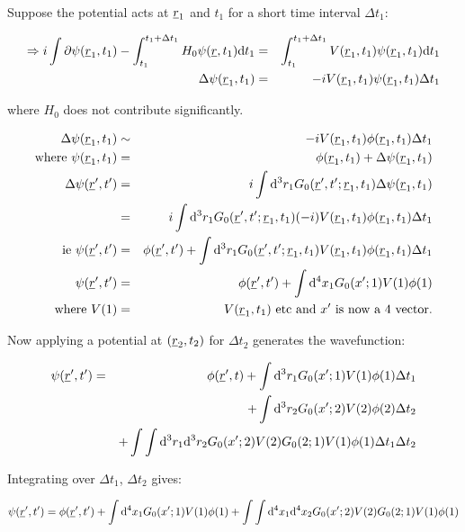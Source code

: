 Suppose the potential acts at $\underline{r}_1$ and $t_1$ for a short time interval $\Delta t_1$:

\begin{eqnarray*}
  \Rightarrow i\int\partial\psi(\underline{r}_1,t_1) - \int_{t_1}^{t_1+\Delta t_1}H_0\psi(\underline{r},t_1)\mathrm{d}t_1 & = & \int_{t_1}^{t_1+\Delta t_1} V(\underline{r}_1,t_1)\psi(\underline{r}_1,t_1)\mathrm{d}t_1 \\
  \Delta\psi(\underline{r}_1,t_1) & = & -iV(\underline{r}_1,t_1)\psi(\underline{r}_1,t_1)\Delta t_1
\end{eqnarray*}

where $H_0$ does not contribute significantly.

\begin{eqnarray*}
  \Delta \psi(\underline{r}_1,t_1) & \sim & -iV(\underline{r}_1,t_1)\phi(\underline{r}_1,t_1)\Delta t_1 \\
  \textrm{where } \psi(\underline{r}_1,t_1) & = & \phi(\underline{r}_1,t_1) + \Delta \psi(\underline{r}_1,t_1) \\
  \Delta\psi(\underline{r}',t') & = & i \int \mathrm{d}^3r_1 G_0(\underline{r}',t';\underline{r}_1,t_1)\Delta\psi(\underline{r}_1,t_1) \\
  & = & i\int\mathrm{d}^3r_1 G_0(\underline{r}',t';\underline{r}_1,t_1)(-i)V(\underline{r}_1,t_1)\phi(\underline{r}_1,t_1)\Delta t_1 \\
  \textrm{ie } \psi(\underline{r}',t') & = & \phi(\underline{r}',t') + \int\mathrm{d}^3r_1 G_0(\underline{r}',t';\underline{r}_1,t_1)V(\underline{r}_1,t_1)\phi(\underline{r}_1,t_1)\Delta t_1 \\
  \psi(\underline{r}',t') & = & \phi(\underline{r}',t') + \int \mathrm{d}^4x_1 G_0(x';1)V(1)\phi(1) \\
  \textrm{where }V(1) & = & V(\underline{r}_1,t_1) \textrm{ etc and } x' \textrm{ is now a 4 vector.}
\end{eqnarray*}

Now applying a potential at $(\underline{r}_2,t_2)$ for $\Delta t_2$ generates the wavefunction:

\begin{eqnarray*}
  \psi(\underline{r}',t') & = & \phi(\underline{r}',t) + \int \mathrm{d}^3r_1G_0(x';1)V(1)\phi(1)\Delta t_1 \\
                          &   & + \int \mathrm{d}^3r_2 G_0(x';2)V(2)\phi(2)\Delta t_2 \\
                          &   & + \int\int \mathrm{d}^3r_1 \mathrm{d}^3r_2 G_0(x';2)V(2)G_0(2;1)V(1)\phi(1)\Delta t_1 \Delta t_2
\end{eqnarray*}

Integrating over $\Delta t_1$, $\Delta t_2$ gives:

\[
  \psi(\underline{r}',t') = \phi(\underline{r}',t') + \int\mathrm{d}^4x_1 G_0(x';1)V(1)\phi(1) + \int\int\mathrm{d}^4x_1 \mathrm{d}^4x_2 G_0(x';2)V(2)G_0(2;1)V(1)\phi(1)
\]


